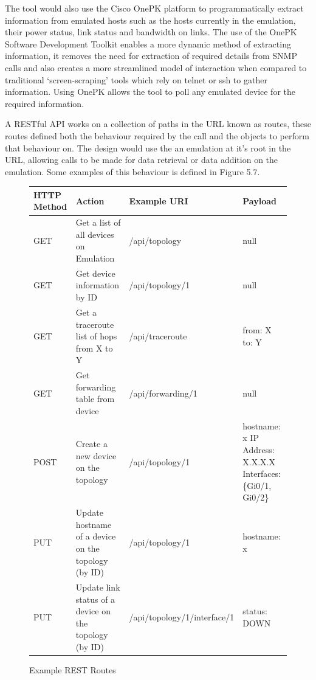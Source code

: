 \documentclass[11pt]{report}
\begin{document}
The tool would also use the Cisco OnePK \citep{OnePK} platform to programmatically extract information from emulated hosts such as the hosts currently in the emulation, their power status, link status and bandwidth on links. The use of the OnePK Software Development Toolkit enables a more dynamic method of extracting information, it removes the need for extraction of required details from SNMP calls and also creates a more streamlined model of interaction when compared to traditional `screen-scraping' tools which rely on telnet or ssh to gather information. Using OnePK allows the tool to poll any emulated device for the required information.

A RESTful API works on a collection of paths in the URL known as routes, these routes defined both the behaviour required by the call and the objects to perform that behaviour on. The design would use the an emulation at it's root in the URL, allowing calls to be made for data retrieval or data addition on the emulation. Some examples of this behaviour is defined in Figure 5.7.


\begin{figure}[h!]
	\caption{Example REST Routes}
	\centering
	\begin{tabular}{|p{1.5cm}|p{4cm}|p{5cm}|p{3.5cm}|}
		\hline \textbf{HTTP Method} & \textbf{Action} & \textbf{Example URI} & \textbf{Payload} \\ 
		\hline GET & Get a list of all devices on Emulation & /api/topology & null \\ 
		\hline GET & Get device information by ID & /api/topology/1 & null \\ 
		\hline GET & Get a traceroute list of hops from X to Y & /api/traceroute & from: X 
		\newline
		to: Y \\ 
		\hline GET & Get forwarding table from device & /api/forwarding/1 & null  \\ 
		\hline POST & Create a new device on the topology & /api/topology/1 & hostname: x 
		\newline
		IP Address: X.X.X.X 
		\newline
		Interfaces: \{Gi0/1, Gi0/2\} \\ 
		\hline PUT & Update hostname of a  device on the topology (by ID) & /api/topology/1 & hostname: x \\ 
		\hline PUT & Update link status of a  device on the topology (by ID) & /api/topology/1/interface/1 & status: DOWN  \\ 
		\hline
	\end{tabular}
\end{figure}
 
\end{document}
